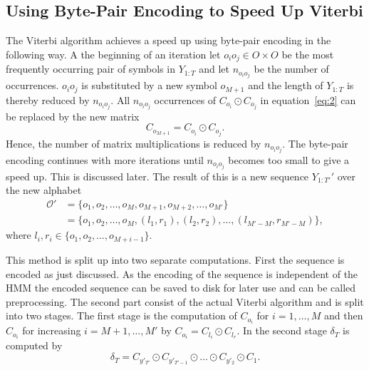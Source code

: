 \subsection{Using Byte-Pair Encoding to Speed Up Viterbi}
\label{sec:using-byte-pair}

The Viterbi algorithm achieves a speed up using byte-pair encoding in the
following way. A the beginning of an iteration let $o_i o_j \in O \times O$ be
the most frequently occurring pair of symbols in $Y_{1:T}$ and let
$n_{o_i o_j}$ be the number of occurrences. $o_i o_j$ is substituted by a new
symbol $o_{M + 1}$ and the length of $Y_{1:T}$ is thereby reduced by
$n_{o_i o_j}$. All $n_{o_i o_j}$ occurrences of $C_{o_i} \odot C_{o_j}$ in
equation~\eqref{eq:2} can be replaced by the new matrix
\begin{equation}
  \label{eq:7}
  C_{o_{M + 1}} = C_{o_i} \odot C_{o_j}.
\end{equation}
Hence, the number of matrix multiplications is reduced by $n_{o_i o_j}$. The
byte-pair encoding continues with more iterations until $n_{o_i o_j}$ becomes
too small to give a speed up. This is discussed later. The result of this is a
new sequence $Y_{1:T'}'$ over the new alphabet
\begin{equation*}
  \begin{aligned}
    \mathcal{O}' & = \{o_1, o_2, \dots, o_M, o_{M + 1}, o_{M + 2}, \dots, o_{M'} \} \\
                 & = \{o_1, o_2, \dots, o_M, (l_1, r_1), (l_2, r_2), \dots, (l_{M' - M}, r_{M' - M}) \},
  \end{aligned}
\end{equation*}
where $l_i, r_i \in \{o_1, o_2, \dots, o_{M + i - 1} \}$.

This method is split up into two separate computations. First the sequence
is encoded as just discussed. As the encoding of the sequence is independent of
the HMM the encoded sequence can be saved to disk for later use and can be
called preprocessing. The second part consist of the actual Viterbi algorithm
and is split into two stages. The first stage is the computation of
$C_{o_i}$ for $i = 1, \dots, M$ and then $C_{o_i}$ for increasing
$i = M + 1, \dots, M'$ by $C_{o_i} = C_{l_i} \odot C_{l_r}$. In the second
stage $\delta_T$ is computed by
\begin{equation}
  \label{eq:3}
  \delta_T = C_{y'_{T'}} \odot C_{y'_{T'-1}} \odot \dots \odot C_{y'_2} \odot C_1.
\end{equation}

